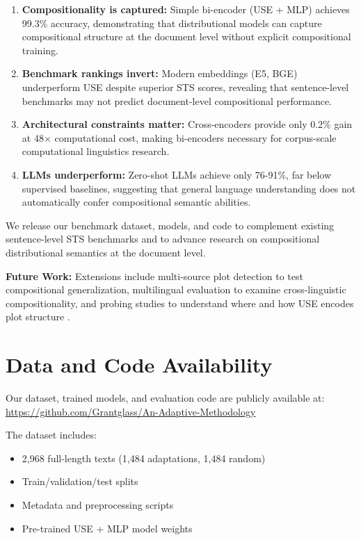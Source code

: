 \documentclass[11pt]{article}
\begin{document}
\begin{enumerate}
    \item \textbf{Compositionality is captured:} Simple bi-encoder (USE + MLP) achieves 99.3\% accuracy, demonstrating that distributional models can capture compositional structure at the document level without explicit compositional training.

    \item \textbf{Benchmark rankings invert:} Modern embeddings (E5, BGE) underperform USE despite superior STS scores, revealing that sentence-level benchmarks may not predict document-level compositional performance.

    \item \textbf{Architectural constraints matter:} Cross-encoders provide only 0.2\% gain at 48× computational cost, making bi-encoders necessary for corpus-scale computational linguistics research.

    \item \textbf{LLMs underperform:} Zero-shot LLMs achieve only 76-91\%, far below supervised baselines, suggesting that general language understanding does not automatically confer compositional semantic abilities.
\end{enumerate}

We release our benchmark dataset, models, and code to complement existing sentence-level STS benchmarks and to advance research on compositional distributional semantics at the document level.

\textbf{Future Work:} Extensions include multi-source plot detection to test compositional generalization, multilingual evaluation to examine cross-linguistic compositionality, and probing studies to understand where and how USE encodes plot structure \cite{VanDerWerfITCDS2022}.

\section*{Data and Code Availability}

Our dataset, trained models, and evaluation code are publicly available at: \\
\url{https://github.com/Grantglass/An-Adaptive-Methodology}

The dataset includes:
\begin{itemize}
    \item 2,968 full-length texts (1,484 adaptations, 1,484 random)
    \item Train/validation/test splits
    \item Metadata and preprocessing scripts
    \item Pre-trained USE + MLP model weights
\end{itemize}
\end{document}
